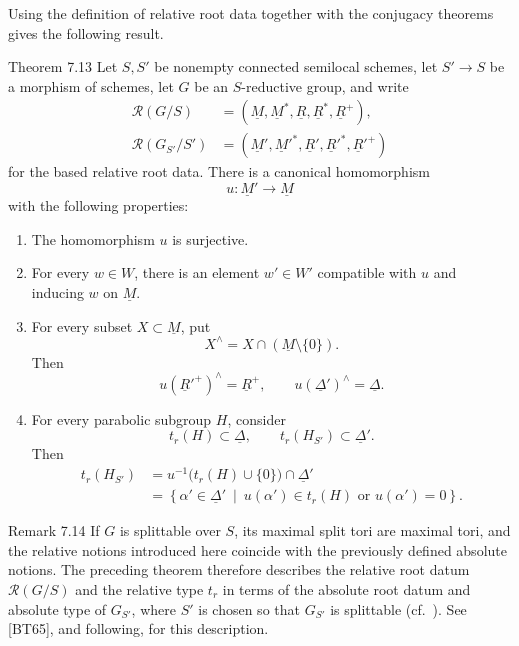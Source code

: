 Using the definition of relative root data together with the
conjugacy theorems gives the following result.

\begin{sgastatement}{Theorem 7.13}
Let \(S,S'\) be nonempty connected semilocal schemes, let
\(S'\to S\) be a morphism of schemes, let \(G\) be an
\(S\)-reductive group, and write
\[
\begin{aligned}
 \mathcal R(G/S)
  &=(\underline M,\underline M^*,\underline R,
     \underline R^*,\underline R^+),\\
 \mathcal R(G_{S'}/S')
  &=(\underline M',\underline M'^*,\underline R',
     \underline R'^*,\underline R'^+)
\end{aligned}
\]
for the based relative root data.  There is a canonical
homomorphism
\[
 u:\underline M'\longrightarrow\underline M
\]
with the following properties:
\begin{enumerate}[label=\textup{(\roman*)}]
\item The homomorphism \(u\) is surjective.
\item For every \(w\in W\), there is an element \(w'\in W'\)
compatible with \(u\) and inducing \(w\) on \(\underline M\).
\item For every subset \(X\subset\underline M\), put
\[
 X^\wedge=X\cap(\underline M\setminus\{0\}).
\]
Then
\[
 u(\underline R'^+)^\wedge=\underline R^+,
 \qquad
 u(\underline\Delta')^\wedge=\underline\Delta.
\]
\item For every parabolic subgroup \(H\), consider
\[
 t_r(H)\subset\underline\Delta,
 \qquad
 t_r(H_{S'})\subset\underline\Delta'.
\]
Then
\[
\begin{aligned}
 t_r(H_{S'})
 &=u^{-1}\bigl(t_r(H)\cup\{0\}\bigr)
       \cap\underline\Delta'\\
 &=\left\{\alpha'\in\underline\Delta'
       \ \middle|\ 
       u(\alpha')\in t_r(H)\text{ or }u(\alpha')=0
   \right\}.
\end{aligned}
\]
\end{enumerate}
\end{sgastatement}

\begin{sgastatement}{Remark 7.14}
If \(G\) is splittable over \(S\), its maximal split tori are
maximal tori, and the relative notions introduced here coincide
with the previously defined absolute notions.  The preceding
theorem therefore describes the relative root datum
\(\mathcal R(G/S)\) and the relative type \(t_r\) in terms of the
absolute root datum and absolute type of \(G_{S'}\), where \(S'\) is
chosen so that \(G_{S'}\) is splittable
\textup{(cf.\ )}.  See \textup{[BT65]}, 
and following, for this description.
\end{sgastatement}

